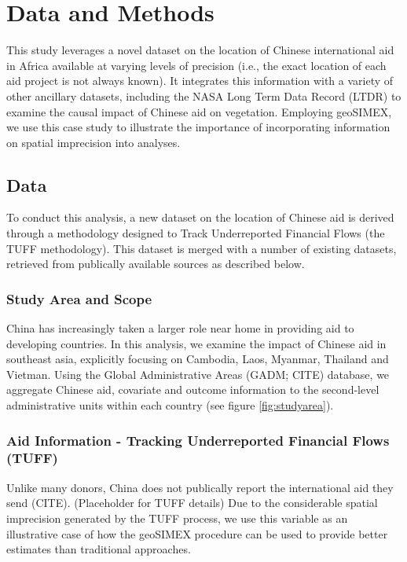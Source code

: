 \newpage

\section{Data and Methods}
This study leverages a novel dataset on the location of Chinese international aid in Africa available at varying levels of precision (i.e., the exact location of each aid project is not always known).  
It integrates this information with a variety of other ancillary datasets, including the NASA Long Term Data Record (LTDR) to examine the causal impact of Chinese aid on vegetation.  
Employing geoSIMEX, we use this case study to illustrate the importance of incorporating information on spatial imprecision into analyses.
\subsection{Data}
To conduct this analysis, a new dataset on the location of Chinese aid is derived through a methodology designed to Track Underreported Financial Flows (the TUFF methodology).  
This dataset is merged with a number of existing datasets, retrieved from publically available sources as described below.

\subsubsection{Study Area and Scope}
China has increasingly taken a larger role near home in providing aid to developing countries.
In this analysis, we examine the impact of Chinese aid in southeast asia, explicitly focusing on Cambodia, Laos, Myanmar, Thailand and Vietman.
Using the Global Administrative Areas (GADM; CITE) database, we aggregate Chinese aid, covariate and outcome information to the second-level administrative units within each country (see figure \ref{fig:studyarea}).



\subsubsection{Aid Information - Tracking Underreported Financial Flows (TUFF)}
Unlike many donors, China does not publically report the international aid they send (CITE).
(Placeholder for TUFF details)
Due to the considerable spatial imprecision generated by the TUFF process, we use this variable as an illustrative case of how the geoSIMEX procedure can be used to provide better estimates than traditional approaches.

